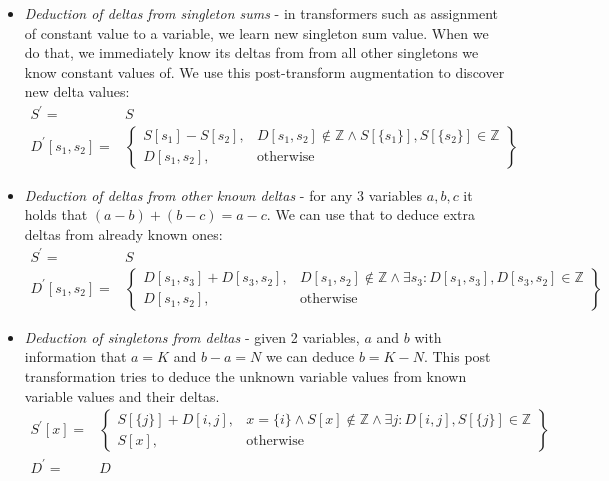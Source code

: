 \begin{itemize}
\item \textit{Deduction of deltas from singleton sums} - in transformers such as assignment of constant value to a variable, we learn new singleton sum value. When we do that, we immediately know its deltas from from all other singletons we know constant values of. We use this post-transform augmentation to discover new delta values:
\begin{align*}
S^\prime = & S \\
D^\prime[s_1, s_2] = & \left.
	\begin{cases}
		S[s_1] - S[s_2], & D[s_1, s_2] \notin \mathbb{Z} \land S[\{s_1\}],S[\{s_2\}] \in \mathbb{Z} \\
		D[s_1,s_2], & \text{otherwise}
	\end{cases}
\right\}
\end{align*}
\item \textit{Deduction of deltas from other known deltas} - for any 3 variables $a,b,c$ it holds that $(a-b) + (b-c) = a-c$. We can use that to deduce extra deltas from already known ones:
\begin{align*}
S^\prime = & S \\
D^\prime[s_1, s_2] = & \left.
	\begin{cases}
		D[s_1,s_3] + D[s_3, s_2], & D[s_1, s_2] \notin \mathbb{Z} \land \exists s_3: D[s_1,s_3],D[s_3,s_2] \in \mathbb{Z} \\
		D[s_1,s_2], & \text{otherwise}
	\end{cases}
\right\}
\end{align*}

\item \textit{Deduction of singletons from deltas} - given 2 variables, $a$ and $b$ with information that $a=K$ and $b-a=N$ we can deduce $b = K - N$. This post transformation tries to deduce the unknown variable values from known variable values and their deltas.
\begin{align*}
S^\prime[x] = & \left.
	\begin{cases}
		S[\{j\}] + D[i,j], & x=\{i\}\land S[x] \notin \mathbb{Z} \land \exists j: D[i,j],S[\{j\}]\in \mathbb{Z} \\
		S[x], & \text{otherwise}
	\end{cases}
\right\}\\
D^\prime= & D
\end{align*}


\end{itemize}
